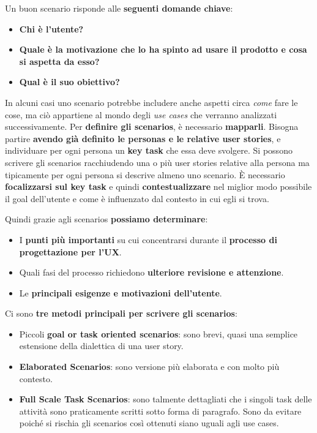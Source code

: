 Un buon scenario risponde alle \textbf{seguenti domande chiave}:

\begin{itemize}
	\itemsep-0.3em
	\item \textbf{Chi è l'utente?}
	\item \textbf{Quale è la motivazione che lo ha spinto ad usare il prodotto e cosa si aspetta da esso?}
	\item \textbf{Qual è il suo obiettivo?}
\end{itemize}

In alcuni casi uno scenario potrebbe includere anche aspetti circa \textit{come} fare le cose, ma ciò appartiene al mondo degli \textit{use cases}
che verranno analizzati successivamente. Per \textbf{definire gli scenarios}, è necessario \textbf{mapparli}. Bisogna partire \textbf{avendo già
definito le personas e le relative user stories}, e individuare per ogni persona un \textbf{key task} che essa deve svolgere. Si possono scrivere
gli scenarios racchiudendo una o più user stories relative alla persona ma tipicamente per ogni persona si descrive  almeno uno scenario.
È necessario \textbf{focalizzarsi sul key task} e quindi \textbf{contestualizzare} nel miglior modo possibile il goal dell'utente e come è
influenzato dal contesto in cui egli si trova.

Quindi grazie agli scenarios \textbf{possiamo determinare}:

\begin{itemize}
	\itemsep-0.3em
	\item I \textbf{punti più importanti} su cui concentrarsi durante il \textbf{processo di progettazione per l'UX}.
	\item Quali fasi del processo richiedono \textbf{ulteriore revisione e attenzione}.
	\item Le \textbf{principali esigenze e motivazioni dell'utente}.
\end{itemize}

Ci sono \textbf{tre metodi principali per scrivere gli scenarios}:

\begin{itemize}
	\itemsep-0.3em
	\item Piccoli \textbf{goal or task oriented scenarios}: sono brevi, quasi una semplice estensione della dialettica di una user story.
	\item \textbf{Elaborated Scenarios}: sono versione più elaborata e con molto più contesto.
	\item \textbf{Full Scale Task Scenarios}: sono talmente dettagliati che i singoli task delle attività sono praticamente scritti sotto forma di
	paragrafo. Sono da evitare poiché si rischia gli scenarios così ottenuti siano uguali agli use cases.
\end{itemize}

